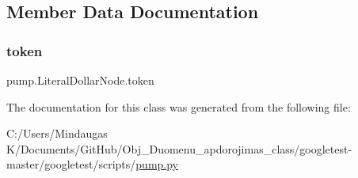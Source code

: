\subsection{Member Data Documentation}
\mbox{\label{classpump_1_1_literal_dollar_node_ab4c6e209635b8868bcdf0fe8053431c6}} 
\subsubsection{\texorpdfstring{token}{token}}
{\footnotesize\ttfamily pump.\+Literal\+Dollar\+Node.\+token}



The documentation for this class was generated from the following file\+:\begin{DoxyCompactItemize}
\item 
C\+:/\+Users/\+Mindaugas K/\+Documents/\+Git\+Hub/\+Obj\+\_\+\+Duomenu\+\_\+apdorojimas\+\_\+class/googletest-\/master/googletest/scripts/\mbox{\hyperlink{googletest-master_2googletest_2scripts_2pump_8py}{pump.\+py}}\end{DoxyCompactItemize}
